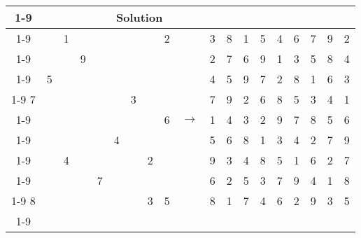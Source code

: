 \documentclass{article}
\begin{document}
\begin{tabular}{||c|c|c||c|c|c||c|c|c|| c ||c|c|c||c|c|c||c|c|c||}
  \cmidrule{1-9} \cmidrule{11-19}
  \multicolumn{9}{|c|}{Problem} &                   & \multicolumn{9}{|c|}{Solution}   \\\cmidrule{1-9} \cmidrule{11-19} \morecmidrules \cmidrule{1-9} \cmidrule{11-19}
  &   & 1 &   &   &   &   &   & 2 &  & 3 & 8 & 1 & 5 & 4 & 6 & 7 & 9 & 2\\\cmidrule{1-9} \cmidrule{11-19}
  &   &   & 9 &   &   &   &   &   &  & 2 & 7 & 6 & 9 & 1 & 3 & 5 & 8 & 4\\\cmidrule{1-9} \cmidrule{11-19}
  & 5 &   &   &   &   &   &   &   &  & 4 & 5 & 9 & 7 & 2 & 8 & 1 & 6 & 3\\\cmidrule{1-9} \cmidrule{11-19} \morecmidrules \cmidrule{1-9} \cmidrule{11-19}
7 &   &   &   &   &   & 3 &   &   &  & 7 & 9 & 2 & 6 & 8 & 5 & 3 & 4 & 1\\\cmidrule{1-9} \cmidrule{11-19}
  &   &   &   &   &   &   &   & 6 & $\rightarrow$ & 1 & 4 & 3 & 2 & 9 & 7 & 8 & 5 & 6\\\cmidrule{1-9} \cmidrule{11-19}
  &   &   &   &   & 4 &   &   &   &  & 5 & 6 & 8 & 1 & 3 & 4 & 2 & 7 & 9\\\cmidrule{1-9} \cmidrule{11-19} \morecmidrules \cmidrule{1-9} \cmidrule{11-19}
  &   & 4 &   &   &   &   & 2 &   &  & 9 & 3 & 4 & 8 & 5 & 1 & 6 & 2 & 7\\\cmidrule{1-9} \cmidrule{11-19}
  &   &   &   & 7 &   &   &   &   &  & 6 & 2 & 5 & 3 & 7 & 9 & 4 & 1 & 8\\\cmidrule{1-9} \cmidrule{11-19}
8 &   &   &   &   &   &   & 3 & 5 &  & 8 & 1 & 7 & 4 & 6 & 2 & 9 & 3 & 5\\\cmidrule{1-9} \cmidrule{11-19} \morecmidrules \cmidrule{1-9} \cmidrule{11-19}
\end{tabular}

 
\end{document}
